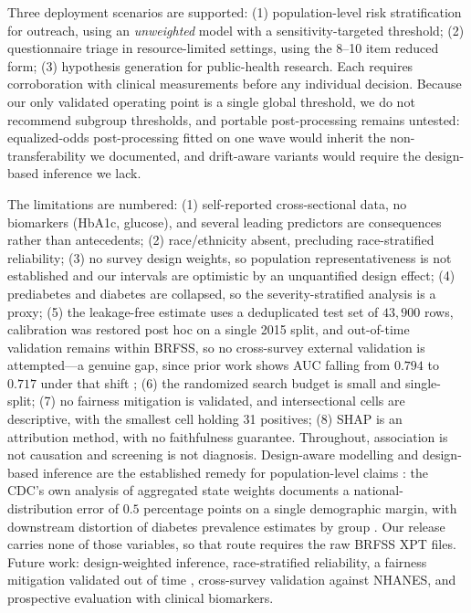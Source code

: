 \documentclass[conference]{IEEEtran}
\begin{document}
Three deployment scenarios are supported: (1) population-level risk stratification for outreach, using an \emph{unweighted} model with a sensitivity-targeted threshold; (2) questionnaire triage in resource-limited settings, using the 8--10 item reduced form; (3) hypothesis generation for public-health research. Each requires corroboration with clinical measurements before any individual decision. Because our only validated operating point is a single global threshold, we do not recommend subgroup thresholds, and portable post-processing remains untested: equalized-odds post-processing fitted on one wave would inherit the non-transferability we documented, and drift-aware variants would require the design-based inference we lack.

The limitations are numbered: (1) self-reported cross-sectional data, no biomarkers (HbA1c, glucose), and several leading predictors are consequences rather than antecedents; (2) race/ethnicity absent, precluding race-stratified reliability; (3) no survey design weights, so population representativeness is not established and our intervals are optimistic by an unquantified design effect; (4) prediabetes and diabetes are collapsed, so the severity-stratified analysis is a proxy; (5) the leakage-free estimate uses a deduplicated test set of $43{,}900$ rows, calibration was restored post hoc on a single 2015 split, and out-of-time validation remains within BRFSS, so no cross-survey external validation is attempted---a genuine gap, since prior work shows AUC falling from $0.794$ to $0.717$ under that shift \cite{pall2026comprehensive}; (6) the randomized search budget is small and single-split; (7) no fairness mitigation is validated, and intersectional cells are descriptive, with the smallest cell holding 31 positives; (8) SHAP is an attribution method, with no faithfulness guarantee. Throughout, association is not causation and screening is not diagnosis. Design-aware modelling and design-based inference are the established remedy for population-level claims \cite{matabuena2024screening}: the CDC's own analysis of aggregated state weights documents a national-distribution error of $0.5$ percentage points on a single demographic margin, with downstream distortion of diabetes prevalence estimates by group \cite{brfssweighting}. Our release carries none of those variables, so that route requires the raw BRFSS XPT files. Future work: design-weighted inference, race-stratified reliability, a fairness mitigation validated out of time \cite{roy2026kaisen}, cross-survey validation against NHANES, and prospective evaluation with clinical biomarkers.
\end{document}
